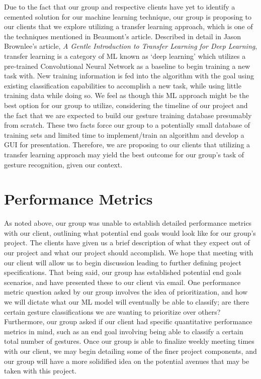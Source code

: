 \documentclass[onecolumn, draftclsnofoot,10pt, compsoc]{IEEEtran}
\begin{document}
Due to the fact that our group and respective clients have yet to identify a cemented solution for our machine learning technique, our group is proposing to our clients that we explore utilizing a transfer learning approach, which is one of the techniques mentioned in Beaumont’s article. Described in detail in Jason Brownlee’s article, \textit{A Gentle Introduction to Transfer Learning for Deep Learning}, transfer learning is a category of ML known as ‘deep learning’ which utilizes a pre-trained Convolutional Neural Network as a baseline to begin training a new task with. New training information is fed into the algorithm with the goal using existing classification capabilities to accomplish a new task, while using little training data while doing so\cite{fourth}. We feel as though this ML approach might be the best option for our group to utilize, considering the timeline of our project and the fact that we are expected to build our gesture training database presumably from scratch. These two facts force our group to a potentially small database of training sets and limited time to implement/train an algorithm and develop a GUI for presentation. Therefore, we are proposing to our clients that utilizing a transfer learning approach may yield the best outcome for our group’s task of gesture recognition, given our context.

\section{Performance Metrics}
As noted above, our group was unable to establish detailed performance metrics with our client, outlining what potential end goals would look like for our group’s project. The clients have given us a brief description of what they expect out of our project and what our project should accomplish. We hope that meeting with our client will allow us to begin discussion leading to further defining project specifications. That being said, our group has established potential end goals scenarios, and have presented these to our client via email. One performance metric question asked by our group involves the idea of prioritization, and how we will dictate what our ML model will eventually be able to classify; are there certain gesture classifications we are wanting to prioritize over others? Furthermore, our group asked if our client had specific quantitative performance metrics in mind, such as an end goal involving being able to classify a certain total number of gestures. Once our group is able to finalize weekly meeting times with our client, we may begin detailing some of the finer project components, and our group will have a more solidified idea on the potential avenues that may be taken with this project. 
\end{document}
